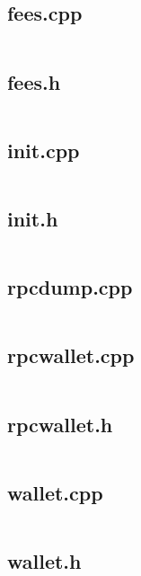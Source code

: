 \documentclass{article}
\begin{document}
\subsection{fees.cpp}
\inputminted{cpp}{/home/dufferzafar/dev/@clones/bitcoin/src/wallet/fees.cpp}
\newpage

\subsection{fees.h}
\inputminted{cpp}{/home/dufferzafar/dev/@clones/bitcoin/src/wallet/fees.h}
\newpage

\subsection{init.cpp}
\inputminted{cpp}{/home/dufferzafar/dev/@clones/bitcoin/src/wallet/init.cpp}
\newpage

\subsection{init.h}
\inputminted{cpp}{/home/dufferzafar/dev/@clones/bitcoin/src/wallet/init.h}
\newpage

\subsection{rpcdump.cpp}
\inputminted{cpp}{/home/dufferzafar/dev/@clones/bitcoin/src/wallet/rpcdump.cpp}
\newpage

\subsection{rpcwallet.cpp}
\inputminted{cpp}{/home/dufferzafar/dev/@clones/bitcoin/src/wallet/rpcwallet.cpp}
\newpage

\subsection{rpcwallet.h}
\inputminted{cpp}{/home/dufferzafar/dev/@clones/bitcoin/src/wallet/rpcwallet.h}
\newpage

\subsection{wallet.cpp}
\inputminted{cpp}{/home/dufferzafar/dev/@clones/bitcoin/src/wallet/wallet.cpp}
\newpage

\subsection{wallet.h}
\inputminted{cpp}{/home/dufferzafar/dev/@clones/bitcoin/src/wallet/wallet.h}
\newpage
\end{document}
